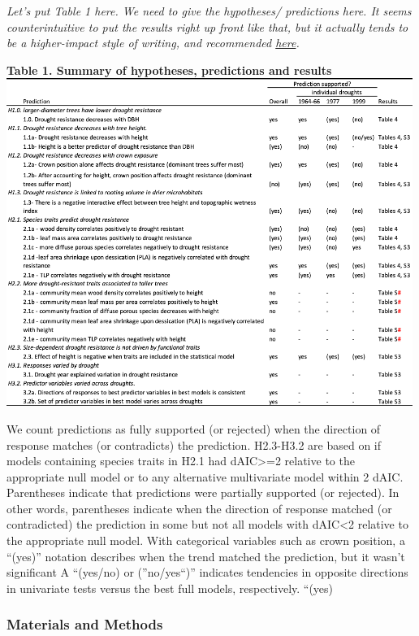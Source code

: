 \documentclass[]{article}
\begin{document}
\emph{Let's put Table 1 here. We need to give the hypotheses/
predictions here. It seems counterintuitive to put the results right up
front like that, but it actually tends to be a higher-impact style of
writing, and recommended
\href{https://journals.plos.org/ploscompbiol/article?id=10.1371/journal.pcbi.1005619}{here}.}

\textbf{Table 1. Summary of hypotheses, predictions and results}
\includegraphics[width=5.20833in]{tables_figures/Table1.png}

We count predictions as fully supported (or rejected) when the direction
of response matches (or contradicts) the prediction. H2.3-H3.2 are based
on if models containing species traits in H2.1 had dAIC\textgreater{}=2
relative to the appropriate null model or to any alternative
multivariate model within 2 dAIC. Parentheses indicate that predictions
were partially supported (or rejected). In other words, parentheses
indicate when the direction of response matched (or contradicted) the
prediction in some but not all models with dAIC\textless{}2 relative to
the appropriate null model. With categorical variables such as crown
position, a ``(yes)'' notation describes when the trend matched the
prediction, but it wasn't significant A ``(yes/no) or (''no/yes``)''
indicates tendencies in opposite directions in univariate tests versus
the best full models, respectively. ``(yes)

\subsubsection{Materials and Methods}\label{materials-and-methods}
\end{document}
